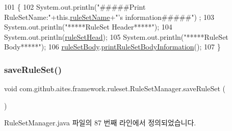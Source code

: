 \begin{DoxyCode}
101                                           \{
102             System.out.println(\textcolor{stringliteral}{"#####Print RuleSetName:"}+this.\mbox{\hyperlink{classcom_1_1github_1_1aites_1_1framework_1_1ruleset_1_1_rule_set_manager_aeb9d61ae7f558514e41f5ed18b00a56e}{ruleSetName}}+\textcolor{stringliteral}{"'s information#####"})
      ;
103             System.out.println(\textcolor{stringliteral}{"*****RuleSet Header*****"});
104             System.out.println(\mbox{\hyperlink{classcom_1_1github_1_1aites_1_1framework_1_1ruleset_1_1_rule_set_manager_ae9d272c4520c18f269ac835e83be526f}{ruleSetHead}});
105             System.out.println(\textcolor{stringliteral}{"*****RuleSet Body*****"});
106             \mbox{\hyperlink{classcom_1_1github_1_1aites_1_1framework_1_1ruleset_1_1_rule_set_manager_a2218521e8abc1048bd369c7ed1c14c60}{ruleSetBody}}.\mbox{\hyperlink{classcom_1_1github_1_1aites_1_1framework_1_1ruleset_1_1_rule_set_body_af029b953064b2ad419f13f6aee1ab89f}{printRuleSetBodyInformation}}();
107         \}
\end{DoxyCode}
\mbox{\label{classcom_1_1github_1_1aites_1_1framework_1_1ruleset_1_1_rule_set_manager_adc237e185bea2444b990ed25875477c9}} 
\subsubsection{\texorpdfstring{save\+Rule\+Set()}{saveRuleSet()}}
{\footnotesize\ttfamily void com.\+github.\+aites.\+framework.\+ruleset.\+Rule\+Set\+Manager.\+save\+Rule\+Set (\begin{DoxyParamCaption}{ }\end{DoxyParamCaption})}



Rule\+Set\+Manager.\+java 파일의 87 번째 라인에서 정의되었습니다.


